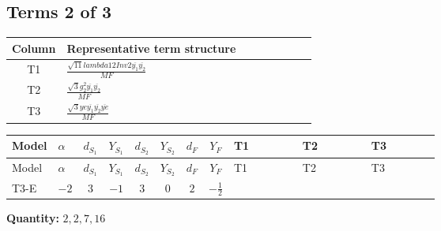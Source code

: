 \documentclass[8pt]{article}
\begin{document}
\begin{landscape}
\subsection*{Terms 2 of 3}
\begin{center}
\begin{tabular}{@{}c >{\raggedright\arraybackslash}p{0.82\linewidth}@{}}
\toprule
Column & Representative term structure \\
\midrule
T1 & \(\displaystyle \frac{\sqrt{11} lambda12Inv2 \overline{y_{1}} \overline{y_{2}}}{MF}\) \\
\midrule
T2 & \(\displaystyle \frac{\sqrt{3} g_{2}^{2} \overline{y_{1}} \overline{y_{2}}}{MF}\) \\
\midrule
T3 & \(\displaystyle \frac{\sqrt{3} ye \overline{y_{1}} \overline{y_{2}} \overline{ye}}{MF}\) \\
\midrule
\bottomrule
\end{tabular}
\end{center}
\smallskip
\tiny
\begin{longtable}{@{}llcccccc >{\raggedright\arraybackslash}p{0.21\linewidth} >{\raggedright\arraybackslash}p{0.21\linewidth} >{\raggedright\arraybackslash}p{0.21\linewidth}@{}}
\toprule
Model & $\alpha$ & $d_{S_1}$ & $Y_{S_1}$ & $d_{S_2}$ & $Y_{S_2}$ & $d_F$ & $Y_F$ & T1 & T2 & T3 \\
\midrule
\endfirsthead
\toprule
Model & $\alpha$ & $d_{S_1}$ & $Y_{S_1}$ & $d_{S_2}$ & $Y_{S_2}$ & $d_F$ & $Y_F$ & T1 & T2 & T3 \\
\midrule
\endhead
T3-E & $-2$ & $3$ & $-1$ & $3$ & $0$ & $2$ & $-\frac{1}{2}$ & \scriptsize\adjustbox{max width=\linewidth}{$\begin{gathered} \frac{3 \sqrt{11} lambda12Inv2 \overline{y_{1}} \overline{y_{2}}}{22 MF}\end{gathered}$} & \scriptsize\adjustbox{max width=\linewidth}{$\begin{gathered} \frac{49 \sqrt{3} g_{2}^{2} \overline{y_{1}} \overline{y_{2}}}{24 MF}\end{gathered}$} & \scriptsize\adjustbox{max width=\linewidth}{$\begin{gathered} - \frac{\sqrt{3} ye \overline{y_{1}} \overline{y_{2}} \overline{ye}}{12 MF}\end{gathered}$} \\
\midrule
\bottomrule
\end{longtable}
\clearpage
\noindent\textbf{Quantity: }$\mathrm{2,2,7,16}$\par\smallskip

\end{landscape}
\end{document}
